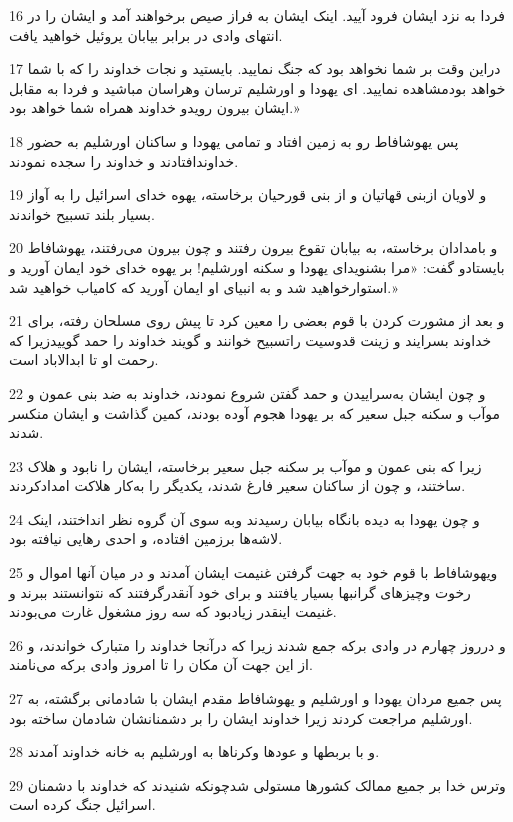 \par 16 فردا به نزد ایشان فرود آیید. اینک ایشان به فراز صیص برخواهند آمد و ایشان را در انتهای وادی در برابر بیابان یروئیل خواهید یافت.
\par 17 دراین وقت بر شما نخواهد بود که جنگ نمایید. بایستید و نجات خداوند را که با شما خواهد بودمشاهده نمایید. ای یهودا و اورشلیم ترسان وهراسان مباشید و فردا به مقابل ایشان بیرون رویدو خداوند همراه شما خواهد بود.»
\par 18 پس یهوشافاط رو به زمین افتاد و تمامی یهودا و ساکنان اورشلیم به حضور خداوندافتادند و خداوند را سجده نمودند.
\par 19 و لاویان ازبنی قهاتیان و از بنی قورحیان برخاسته، یهوه خدای اسرائیل را به آواز بسیار بلند تسبیح خواندند.
\par 20 و بامدادان برخاسته، به بیابان تقوع بیرون رفتند و چون بیرون می‌رفتند، یهوشافاط بایستادو گفت: «مرا بشنوید‌ای یهودا و سکنه اورشلیم! بر یهوه خدای خود ایمان آورید و استوارخواهید شد و به انبیای او ایمان آورید که کامیاب خواهید شد.»
\par 21 و بعد از مشورت کردن با قوم بعضی را معین کرد تا پیش روی مسلحان رفته، برای خداوند بسرایند و زینت قدوسیت راتسبیح خوانند و گویند خداوند را حمد گوییدزیرا که رحمت او تا ابدالاباد است.
\par 22 و چون ایشان به‌سراییدن و حمد گفتن شروع نمودند، خداوند به ضد بنی عمون و موآب و سکنه جبل سعیر که بر یهودا هجوم آوده بودند، کمین گذاشت و ایشان منکسر شدند.
\par 23 زیرا که بنی عمون و موآب بر سکنه جبل سعیر برخاسته، ایشان را نابود و هلاک ساختند، و چون از ساکنان سعیر فارغ شدند، یکدیگر را به‌کار هلاکت امدادکردند.
\par 24 و چون یهودا به دیده بانگاه بیابان رسیدند وبه سوی آن گروه نظر انداختند، اینک لاشه‌ها برزمین افتاده، و احدی رهایی نیافته بود.
\par 25 ویهوشافاط با قوم خود به جهت گرفتن غنیمت ایشان آمدند و در میان آنها اموال و رخوت وچیزهای گرانبها بسیار یافتند و برای خود آنقدرگرفتند که نتوانستند ببرند و غنیمت اینقدر زیادبود که سه روز مشغول غارت می‌بودند.
\par 26 و درروز چهارم در وادی برکه جمع شدند زیرا که درآنجا خداوند را متبارک خواندند، و از این جهت آن مکان را تا امروز وادی برکه می‌نامند.
\par 27 پس جمیع مردان یهودا و اورشلیم و یهوشافاط مقدم ایشان با شادمانی برگشته، به اورشلیم مراجعت کردند زیرا خداوند ایشان را بر دشمنانشان شادمان ساخته بود.
\par 28 و با بربطها و عودها وکرناها به اورشلیم به خانه خداوند آمدند.
\par 29 وترس خدا بر جمیع ممالک کشورها مستولی شدچونکه شنیدند که خداوند با دشمنان اسرائیل جنگ کرده است.
